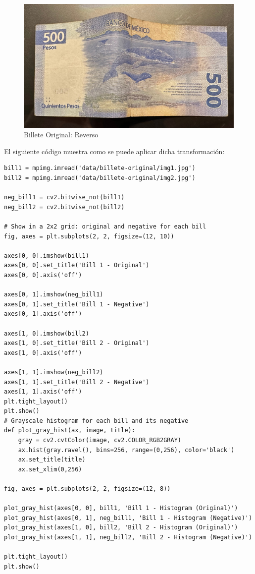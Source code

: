 \documentclass[12pt,letterpaper]{article}
\begin{document}
\begin{figure}[H]
  \centering
  \includegraphics[width=0.5\linewidth]{../data/billete-original/img1.jpg}
  \caption{Billete Original: Reverso}
  \label{fig:billete_original_reverso}
\end{figure}


El siguiente código muestra como se puede aplicar dicha transformación:

\begin{verbatim}
bill1 = mpimg.imread('data/billete-original/img1.jpg')
bill2 = mpimg.imread('data/billete-original/img2.jpg')

neg_bill1 = cv2.bitwise_not(bill1)
neg_bill2 = cv2.bitwise_not(bill2)

# Show in a 2x2 grid: original and negative for each bill
fig, axes = plt.subplots(2, 2, figsize=(12, 10))

axes[0, 0].imshow(bill1)
axes[0, 0].set_title('Bill 1 - Original')
axes[0, 0].axis('off')

axes[0, 1].imshow(neg_bill1)
axes[0, 1].set_title('Bill 1 - Negative')
axes[0, 1].axis('off')

axes[1, 0].imshow(bill2)
axes[1, 0].set_title('Bill 2 - Original')
axes[1, 0].axis('off')

axes[1, 1].imshow(neg_bill2)
axes[1, 1].set_title('Bill 2 - Negative')
axes[1, 1].axis('off')
plt.tight_layout()
plt.show()
# Grayscale histogram for each bill and its negative
def plot_gray_hist(ax, image, title):
    gray = cv2.cvtColor(image, cv2.COLOR_RGB2GRAY)
    ax.hist(gray.ravel(), bins=256, range=(0,256), color='black')
    ax.set_title(title)
    ax.set_xlim(0,256)

fig, axes = plt.subplots(2, 2, figsize=(12, 8))

plot_gray_hist(axes[0, 0], bill1, 'Bill 1 - Histogram (Original)')
plot_gray_hist(axes[0, 1], neg_bill1, 'Bill 1 - Histogram (Negative)')
plot_gray_hist(axes[1, 0], bill2, 'Bill 2 - Histogram (Original)')
plot_gray_hist(axes[1, 1], neg_bill2, 'Bill 2 - Histogram (Negative)')

plt.tight_layout()
plt.show()
\end{verbatim}
\end{document}
